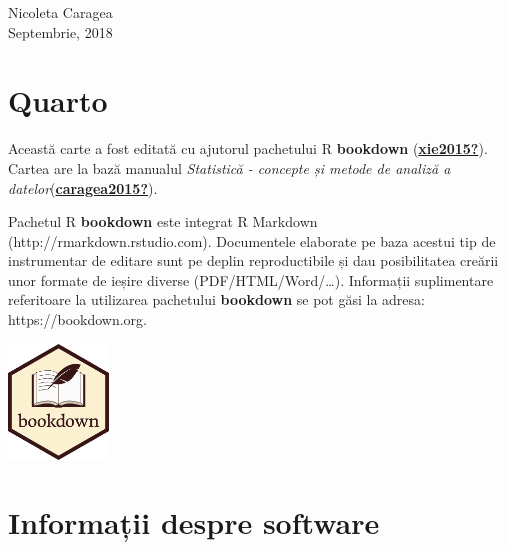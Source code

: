 \documentclass[
  11pt,
  b5paper,
  nottoc]{book}
\begin{document}
\begin{flushright}
Nicoleta Caragea \\
Septembrie, 2018
\end{flushright}

\newpage

\hypertarget{quarto}{%
\section*{Quarto}\label{quarto}}


Această carte a fost editată cu ajutorul pachetului R \textbf{bookdown}
(\protect\hyperlink{ref-xie2015}{\textbf{xie2015?}}).\\
Cartea are la bază manualul \emph{Statistică - concepte și metode de
analiză a
datelor}(\protect\hyperlink{ref-caragea2015}{\textbf{caragea2015?}}).

Pachetul R \textbf{bookdown} este integrat R Markdown
(http://rmarkdown.rstudio.com). Documentele elaborate pe baza acestui
tip de instrumentar de editare sunt pe deplin reproductibile și dau
posibilitatea creării unor formate de ieșire diverse
(PDF/HTML/Word/\ldots). Informații suplimentare referitoare la
utilizarea pachetului \textbf{bookdown} se pot găsi la adresa:
https://bookdown.org.

\includegraphics[width=0.2\textwidth]{images/logo.png}

\hypertarget{informaux21bii-despre-software}{%
\section*{Informații despre
software}\label{informaux21bii-despre-software}}

\end{document}

